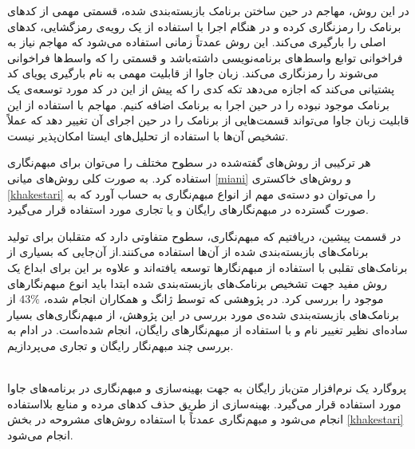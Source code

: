  در این روش، مهاجم در حین ساختن برنامک‌ بازبسته‌بندی شده، قسمتی مهمی از کد‌های برنامک را رمز‌نگاری کرده و در هنگام اجرا با استفاده از یک رویه‌ی رمز‌گشایی، کد‌های اصلی را بارگیری می‌کند. این روش عمدتاً زمانی استفاده می‌شود که مهاجم نیاز به فراخوانی توابع واسط‌های برنامه‌نویسی داشته‌باشد و قسمتی را که واسط‌ها فراخوانی می‌شوند را رمزنگاری می‌کند.
 زبان جاوا از قابلیت مهمی به نام بارگیری پویا‌ی کد پشتیانی می‌کند که اجازه می‌دهد تکه کدی را که پیش از این در کد مورد توسعه‌ی یک برنامک موجود نبوده را در حین اجرا به برنامک اضافه کنیم. مهاجم با استفاده از این قابلیت زبان‌ جاوا می‌تواند قسمت‌هایی از برنامک‌ را در حین اجرای آن تغییر دهد که عملاً تشخیص آن‌ها با استفاده از تحلیل‌های ایستا امکان‌‌پذیر نیست.

هر ترکیبی از روش‌های گفته‌شده در سطوح مختلف را می‌توان برای مبهم‌نگاری استفاده کرد. به صورت کلی روش‌های میانی 
\ref{miani}
و روش‌های خاکستری
\ref{khakestari}
را می‌توان دو دسته‌ی مهم از انواع مبهم‌نگاری به حساب آورد که به صورت گسترده در مبهم‌نگار‌های رایگان و یا تجاری مورد استفاده قرار می‌گیرد.




در قسمت پیشین، دریافتیم که مبهم‌نگاری، سطوح متفاوتی دارد که متقلبان برای تولید برنامک‌های بازبسته‌بندی شده از آن‌ها استفاده می‌کنند.از آن‌جایی که بسیاری از برنامک‌های تقلبی با استفاده از مبهم‌نگار‌ها توسعه‌ یافته‌اند و علاوه بر این برای ابداع یک روش مفید جهت تشخیص برنامک‌های بازبسته‌بندی شده ابتدا باید انوع مبهم‌نگار‌های موجود را بررسی کرد. در پژوهشی که توسط ژانگ و همکاران انجام ‌شده،
$43\%$
از برنامک‌های بازبسته‌بندی شده‌ی مورد بررسی در این پژوهش، از مبهم‌نگاری‌های بسیار ساده‌ای نظیر تغییر نام و با استفاده از مبهم‌نگار‌های رایگان، انجام شده‌است. در ادام به بررسی چند مبهم‌نگار رایگان و تجاری می‌پردازیم. 

 \\
پروگارد یک نرم‌افزار متن‌باز رایگان به جهت بهینه‌سازی و مبهم‌نگاری در برنامه‌های جاوا مورد استفاده قرار می‌گیرد. بهینه‌سازی از طریق حذف کد‌های مرده و منابع بلااستفاده انجام می‌شود و مبهم‌نگاری عمدتاً با استفاده روش‌‌های مشروحه در بخش 
\ref{khakestari}
انجام می‌شود.

